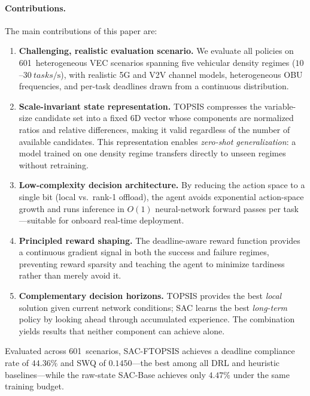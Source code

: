 \documentclass[iicol]{sn-jnl}
\begin{document}
\paragraph{Contributions.}
The main contributions of this paper are:
\begin{enumerate}[leftmargin=*,nosep]
  \item \textbf{Challenging, realistic evaluation scenario.}
        We evaluate all policies on 601~heterogeneous VEC scenarios spanning
        five vehicular density regimes ($10$–$\SI{30}{tasks\per\second}$), with
        realistic 5G and V2V channel models, heterogeneous OBU frequencies,
        and per-task deadlines drawn from a continuous distribution.

  \item \textbf{Scale-invariant state representation.}
        TOPSIS compresses the variable-size candidate set into a fixed 6D
        vector whose components are normalized ratios and relative differences,
        making it valid regardless of the number of available candidates.
        This representation enables \emph{zero-shot generalization}: a model
        trained on one density regime transfers directly to unseen regimes
        without retraining.

  \item \textbf{Low-complexity decision architecture.}
        By reducing the action space to a single bit (local vs.\ rank-1
        offload), the agent avoids exponential action-space growth and runs
        inference in $O(1)$ neural-network forward passes per task—suitable
        for onboard real-time deployment.

  \item \textbf{Principled reward shaping.}
        The deadline-aware reward function provides a continuous gradient
        signal in both the success and failure regimes, preventing reward
        sparsity and teaching the agent to minimize tardiness rather than
        merely avoid it.

  \item \textbf{Complementary decision horizons.}
        TOPSIS provides the best \emph{local} solution given current network
        conditions; SAC learns the best \emph{long-term} policy by looking
        ahead through accumulated experience.
        The combination yields results that neither component can achieve alone.
\end{enumerate}

Evaluated across 601~scenarios, SAC-FTOPSIS achieves a deadline compliance rate
of $44.36\%$ and SWQ of $0.1450$—the best among all DRL and heuristic
baselines—while the raw-state SAC-Base achieves only $4.47\%$ under the same
training budget.
\end{document}

